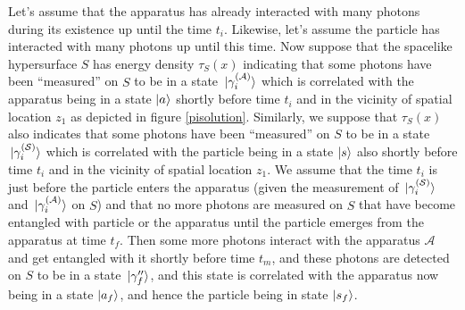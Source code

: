 Let's assume that the  apparatus has already interacted with many photons during its existence up until the time $t_i$. Likewise, let's assume the particle has interacted with many photons up until this time. Now suppose that the spacelike hypersurface $S$ has energy density $\tau_S(x)$ indicating that some photons have been ``measured'' on $S$ to be in a state $\ket*{\gamma_i^{(\mathcal{A})}}$ which is correlated with the apparatus being in a state $\ket{a}$ shortly before time $t_i$ and in the vicinity of spatial location $z_1$ as depicted in figure \ref{pisolution}. Similarly, we suppose that $\tau_S(x)$ also indicates that some photons have been ``measured'' on $S$ to be in a state $\ket*{\gamma_i^{(\mathcal{S})}}$ which is correlated with the particle being in a state $\ket{s}$ also shortly before time $t_i$ and in the vicinity of spatial location $z_1$. We assume that the time $t_i$ is just before the particle enters the apparatus (given the measurement of $\ket*{\gamma_i^{(\mathcal{S})}}$ and  $\ket*{\gamma_i^{(\mathcal{A})}}$ on $S$) and that no more photons are measured on $S$ that have become entangled with particle  or the apparatus until the particle emerges from the apparatus at time $t_f$. Then some more photons interact with the apparatus $\mathcal{A}$ and get entangled with it shortly before time $t_m$, and these photons are detected on $S$ to be in a state  $\ket*{\gamma_f^{\prime\prime}}$, and this state is correlated with the apparatus now being in a state $\ket{a_{f}}$, and hence the particle being in state $\ket{s_f}$. 

